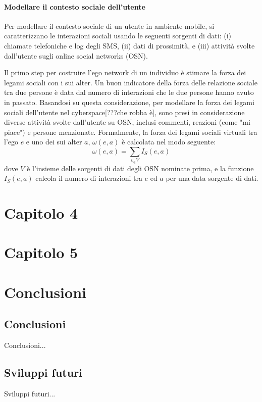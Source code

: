 \documentclass[12pt,italian]{report}
\begin{document}
\subsubsection{Modellare il contesto sociale dell'utente}
Per modellare il contesto sociale di un utente in ambiente mobile, si caratterizzano le interazioni sociali usando le seguenti sorgenti di dati: (i) chiamate telefoniche e log degli SMS, (ii) dati di prossimità, e (iii) attività svolte dall'utente sugli online social networks (OSN).

Il primo step per costruire l'ego network di un individuo è stimare la forza dei legami sociali con i sui alter. Un buon indicatore della forza delle relazione sociale tra due persone è data dal numero di interazioni che le due persone hanno avuto in passato. Basandosi su questa considerazione, per modellare la forza dei legami sociali dell'utente nel cyberspace[???che robba è], sono presi in considerazione diverse attività svolte dall'utente su OSN, inclusi commenti, reazioni (come "mi piace") e persone menzionate. Formalmente, la forza dei legami sociali virtuali tra l'ego $e$ e uno dei sui alter $a$, $\omega(e,a)$ è calcolata nel modo seguente:
$$
	\omega(e,a)=\sum_{v_\in V}I_S (e, a)
$$
dove $V$ è l'insieme delle sorgenti di dati degli OSN nominate prima, e la funzione $I_S (e, a)$ calcola il numero di interazioni tra $e$ ed $a$ per una data sorgente di dati.

% 
% 

\chapter{Capitolo 4}
\label{chap:datasets}


% 
% 

\chapter{Capitolo 5}
\label{chap:risultati}


% 
% 

\chapter{Conclusioni}
\label{chap:cap6}

\section{Conclusioni}

Conclusioni...

\section{Sviluppi futuri}

Sviluppi futuri...



%
%



\end{document}
